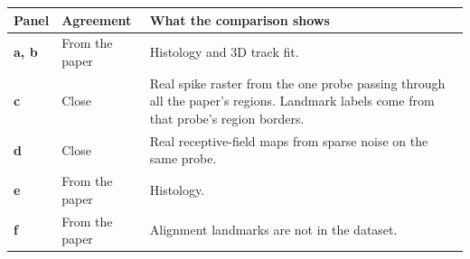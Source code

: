 \begin{longtable}{@{}p{1.1cm}p{2.5cm}p{11.8cm}@{}}
\toprule
Panel & Agreement & What the comparison shows \\
\midrule
\endhead
\textbf{a, b} & From the paper & Histology and 3D track fit. \\
\textbf{c} & Close & Real spike raster from the one probe passing through all the paper's regions. Landmark labels come from that probe's region borders. \\
\textbf{d} & Close & Real receptive-field maps from sparse noise on the same probe. \\
\textbf{e} & From the paper & Histology. \\
\textbf{f} & From the paper & Alignment landmarks are not in the dataset. \\
\bottomrule
\end{longtable}
